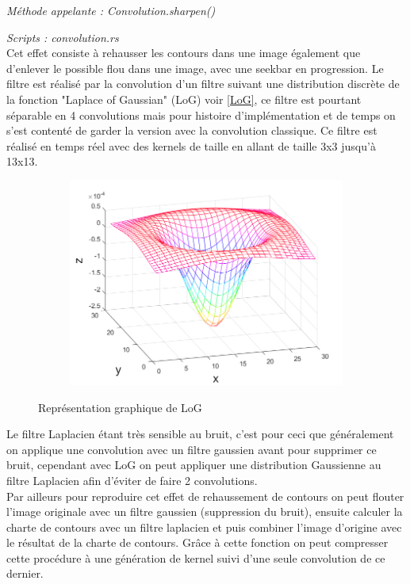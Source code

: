         \emph{Méthode appelante : Convolution.sharpen()}

        \emph{Scripts : convolution.rs} 
        \\

        Cet effet consiste à rehausser les contours dans une image également que d'enlever le possible flou dans une image, avec une seekbar en progression.
        Le filtre est réalisé par la convolution d'un filtre suivant une distribution discrète de la fonction "Laplace of Gaussian" (LoG) voir \ref{LoG},
        ce filtre est pourtant séparable en 4 convolutions mais pour histoire d'implémentation et de temps on s'est contenté de garder la version avec la convolution classique.
        Ce filtre est réalisé en temps réel avec des kernels de taille en allant de taille 3x3 jusqu'à 13x13.

        
        \begin{figure}[!h]
            \centering
            \begin{subfigure}[b]{0.8\textwidth}
                \includegraphics[width=1\textwidth]{report_src/effects/laplacianGaussian.png}
            \end{subfigure}
            \caption*{Représentation graphique de LoG}
        \end{figure}

        Le filtre Laplacien étant très sensible au bruit, c'est pour ceci que généralement on applique une convolution avec un filtre gaussien avant pour supprimer ce bruit,
        cependant avec LoG on peut appliquer une distribution Gaussienne au filtre Laplacien afin d'éviter de faire 2 convolutions.
        \\
        Par ailleurs pour reproduire cet effet de rehaussement de contours on peut
        flouter l'image originale avec un filtre gaussien (suppression du bruit), ensuite calculer la charte de contours avec un filtre laplacien et puis combiner l'image d'origine avec le résultat
        de la charte de contours.
        Grâce à cette fonction on peut compresser cette procédure à une génération de kernel suivi d'une seule convolution de ce dernier.
        \\

